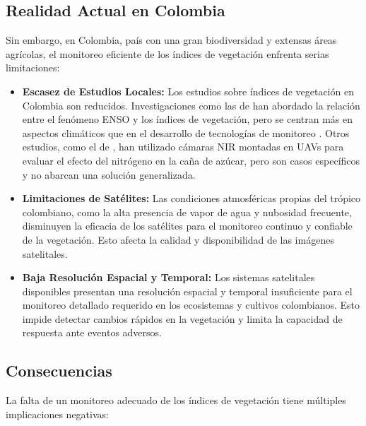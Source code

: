\subsection*{Realidad Actual en Colombia}

Sin embargo, en Colombia, país con una gran biodiversidad y extensas áreas agrícolas, el monitoreo eficiente de los índices de vegetación enfrenta serias limitaciones:

\begin{itemize}
    \item \textbf{Escasez de Estudios Locales:} Los estudios sobre índices de vegetación en Colombia son reducidos. Investigaciones como las de \cite{Poveda2001SeasonalityColombia} han abordado la relación entre el fenómeno ENSO y los índices de vegetación, pero se centran más en aspectos climáticos que en el desarrollo de tecnologías de monitoreo . Otros estudios, como el de \cite{Navia2016MultispectralUAV}, han utilizado cámaras NIR montadas en UAVs para evaluar el efecto del nitrógeno en la caña de azúcar, pero son casos específicos y no abarcan una solución generalizada.

    \item \textbf{Limitaciones de Satélites:} Las condiciones atmosféricas propias del trópico colombiano, como la alta presencia de vapor de agua y nubosidad frecuente, disminuyen la eficacia de los satélites para el monitoreo continuo y confiable de la vegetación. Esto afecta la calidad y disponibilidad de las imágenes satelitales.

    \item \textbf{Baja Resolución Espacial y Temporal:} Los sistemas satelitales disponibles presentan una resolución espacial y temporal insuficiente para el monitoreo detallado requerido en los ecosistemas y cultivos colombianos. Esto impide detectar cambios rápidos en la vegetación y limita la capacidad de respuesta ante eventos adversos.
\end{itemize}

\subsection*{Consecuencias}

La falta de un monitoreo adecuado de los índices de vegetación tiene múltiples implicaciones negativas:

